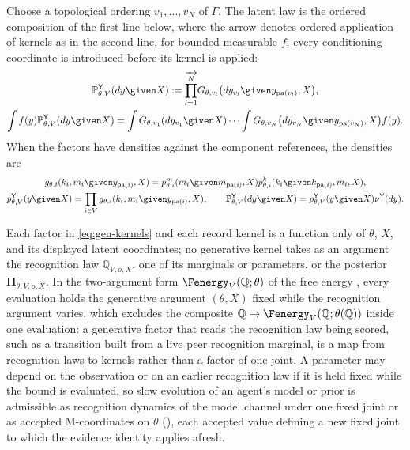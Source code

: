 Choose a topological ordering $v_1,\ldots,v_N$ of $\Gamma$. The latent law is the ordered composition of
the first line below, where the arrow denotes ordered application of kernels as in the second line, for
bounded measurable $f$; every conditioning coordinate is introduced before its kernel is applied:
\begin{gather}
\mathbb P_{\theta,V}^{\mathsf Y}(dy\given X)
:=\overrightarrow{\prod_{l=1}^{N}}
G_{\theta,v_l}\bigl(dy_{v_l}\given y_{\operatorname{pa}(v_l)},X\bigr),
\label{eq:gen-composition}\\
\int f(y)\mathbb P_{\theta,V}^{\mathsf Y}(dy\given X)
=\int G_{\theta,v_1}(dy_{v_1}\given X)\cdots
\int G_{\theta,v_N}\bigl(dy_{v_N}\given y_{\operatorname{pa}(v_N)},X\bigr)f(y).
\label{eq:gen-iterated-integral}
\end{gather}
When the factors have densities against the component references, the densities are
\begin{gather}
g_{\theta,i}(k_i,m_i\given y_{\operatorname{pa}(i)},X)
=p_{\theta,i}^{m}(m_i\given m_{\operatorname{pa}(i)},X)p_{\theta,i}^{k}(k_i\given k_{\operatorname{pa}(i)},m_i,X),
\label{eq:gen-density}\\
p_{\theta,V}^{\mathsf Y}(y\given X)=\prod_{i\in V}g_{\theta,i}(k_i,m_i\given y_{\operatorname{pa}(i)},X),
\qquad
\mathbb P_{\theta,V}^{\mathsf Y}(dy\given X)=p_{\theta,V}^{\mathsf Y}(y\given X)\nu^{\mathsf Y}(dy).
\label{eq:gen-design-density}
\end{gather}

Each factor in \eqref{eq:gen-kernels} and each record kernel is a function only of $\theta$, $X$, and its
displayed latent coordinates; no generative kernel takes as an argument the recognition law
$\mathbb Q_{V,o,X}$, one of its marginals or parameters, or the posterior $\boldsymbol\Pi_{\theta,V,o,X}$. In
the two-argument form $\Fenergy_V(\mathbb Q;\theta)$ of the free energy \citep{Neal1998}, every evaluation
holds the generative argument $(\theta,X)$ fixed while the recognition argument varies, which excludes the
composite $\mathbb Q\mapsto\Fenergy_V(\mathbb Q;\theta(\mathbb Q))$ inside one evaluation: a generative
factor that reads the recognition law being scored, such as a transition built from a live peer
recognition marginal, is a map from recognition laws to kernels rather than a factor of one joint. A
parameter may depend on the observation or on an earlier recognition law if it is held fixed while the
bound is evaluated, so slow evolution of an agent's model or prior is admissible as recognition dynamics
of the model channel under one fixed joint or as accepted M-coordinates on $\theta$
(),
each accepted value defining a new fixed joint to which the evidence identity applies afresh.

